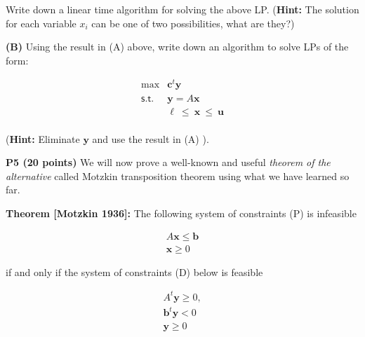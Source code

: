 \documentclass[11pt]{article}
\begin{document}
Write down a linear time algorithm for solving the above LP.
(\textbf{Hint:} The solution for each variable $x_i$ can be one of two
possibilities, what are they?)

\medskip

\noindent\textbf{(B)} Using the result in (A) above, write down an
algorithm to solve LPs of the form:

\[ \begin{array}{rl}
\max & \mathbf{c}^t \mathbf{y} \\
\mathsf{s.t.} & \mathbf{y} = A \mathbf{x} \\
& \mathbf{\ell}\ \leq\ \mathbf{x}\ \leq\ \mathbf{u} \\
\end{array}\]

(\textbf{Hint:} Eliminate $\mathbf{y}$ and use the result in (A) ).

\noindent\textbf{P5 (20 points)} We will now prove a well-known
and useful \emph{theorem of the alternative} called Motzkin
transposition theorem using what we have learned so far.

\begin{framed}
\noindent\textbf{Theorem [Motzkin 1936]:} The following system of constraints \textsf{(P)} is infeasible

\[ \begin{array}{l}
A \mathbf{x} \leq \mathbf{b}\\
 \mathbf{x} \geq 0 
\end{array}\]

 if and only if the system of constraints \textsf{(D)}  below is feasible

\[ \begin{array}{l}
A^t \mathbf{y} \geq 0,\\
\mathbf{b}^t \mathbf{y} < 0\\
\mathbf{y} \geq 0 \\
\end{array}\]
\end{framed}
\end{document}
